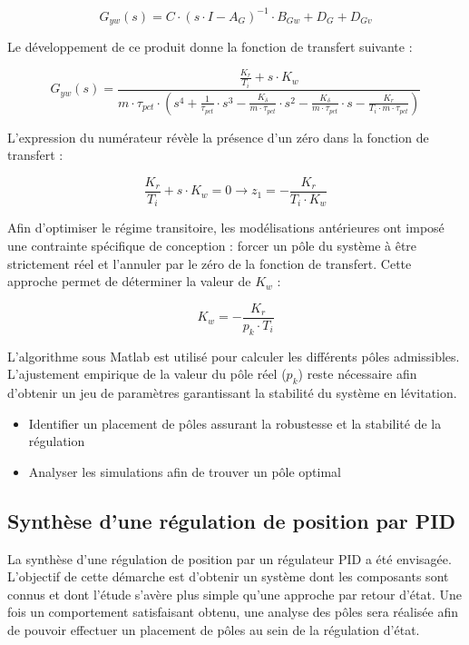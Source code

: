 \begin{equation}
    G_{yw}(s) = C\cdot\left( s\cdot I - A_G \right)^{-1}\cdot B_{Gw} + D_G + D_{Gv}
\end{equation}

Le développement de ce produit donne la fonction de transfert suivante :

\begin{equation}
    G_{yw}(s) = \frac{\frac{K_r}{T_i} + s \cdot K_w}{m \cdot \tau_{pct} \cdot \left( s^4 + \frac{1}{\tau_{pct}} \cdot s^3 - \frac{K_{\dot{\delta}}}{m \cdot \tau_{pct}} \cdot s^2 - \frac{K_\delta}{m \cdot \tau_{pct}} \cdot s - \frac{K_r}{T_i \cdot m \cdot \tau_{pct}} \right)}
\end{equation}

L'expression du numérateur révèle la présence d'un zéro dans la fonction de transfert :

\begin{equation}
    \frac{K_r}{T_i} + s \cdot K_w = 0 \rightarrow z_1 = - \frac{K_r}{T_i\cdot K_w}
\end{equation}

Afin d'optimiser le régime transitoire, les modélisations antérieures ont imposé une contrainte spécifique de conception : forcer un pôle du système à être strictement réel et l'annuler par le zéro de la fonction de transfert. Cette approche permet de déterminer la valeur de $K_w$ :

\begin{equation}
    K_w = - \frac{K_r}{p_k\cdot T_i}
\end{equation}

L'algorithme sous Matlab est utilisé pour calculer les différents pôles admissibles. L'ajustement empirique de la valeur du pôle réel ($p_k$) reste nécessaire afin d'obtenir un jeu de paramètres garantissant la stabilité du système en lévitation.

\begin{itemize}
    \item Identifier un placement de pôles assurant la robustesse et la stabilité de la régulation
    \item Analyser les simulations afin de trouver un pôle optimal
\end{itemize}

\subsection{Synthèse d'une régulation de position par PID}
La synthèse d'une régulation de position par un régulateur PID a été envisagée. L'objectif de cette démarche est d'obtenir un système dont les composants sont connus et dont l'étude s'avère plus simple qu'une approche par retour d'état. Une fois un comportement satisfaisant obtenu, une analyse des pôles sera réalisée afin de pouvoir effectuer un placement de pôles au sein de la régulation d'état.\\

